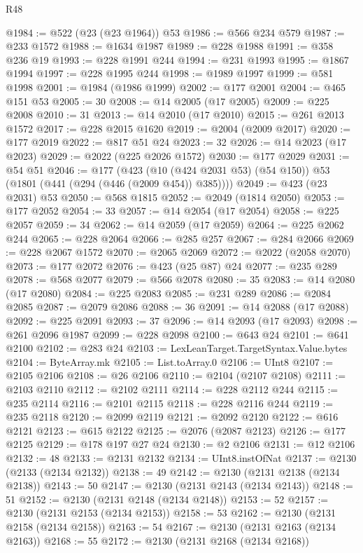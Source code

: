 \begin{lexlean}{R48}
\begin{coremodule}
@1984 := @522 (@23 (@23 @1964)) @53
@1986 := @566 @234 @579
@1987 := @233 @1572
@1988 := @1634 @1987
@1989 := @228 @1988
@1991 := @358 @236 @19
@1993 := @228 @1991 @244
@1994 := @231 @1993
@1995 := @1867 @1994
@1997 := @228 @1995 @244
@1998 := @1989 @1997
@1999 := @581 @1998
@2001 := @1984 (@1986 @1999)
@2002 := @177 @2001
@2004 := @465 @151 @53
@2005 := 30
@2008 := @14 @2005 (@17 @2005)
@2009 := @225 @2008
@2010 := 31
@2013 := @14 @2010 (@17 @2010)
@2015 := @261 @2013 @1572
@2017 := @228 @2015 @1620
@2019 := @2004 (@2009 @2017)
@2020 := @177 @2019
@2022 := @817 @51 @24
@2023 := 32
@2026 := @14 @2023 (@17 @2023)
@2029 := @2022 (@225 @2026 @1572)
@2030 := @177 @2029
@2031 := @54 @51
@2046 := @177
    (@423 (@10 (@424 @2031 @53) (@54 @150)) @53 (@1801 (@441 (@294 (@446 (@2009 @454)) @385))))
@2049 := @423 (@23 @2031) @53
@2050 := @568 @1815
@2052 := @2049 (@1814 @2050)
@2053 := @177 @2052
@2054 := 33
@2057 := @14 @2054 (@17 @2054)
@2058 := @225 @2057
@2059 := 34
@2062 := @14 @2059 (@17 @2059)
@2064 := @225 @2062 @244
@2065 := @228 @2064
@2066 := @285 @257
@2067 := @284 @2066
@2069 := @228 @2067 @1572
@2070 := @2065 @2069
@2072 := @2022 (@2058 @2070)
@2073 := @177 @2072
@2076 := @423 (@25 @87) @24
@2077 := @235 @289
@2078 := @568 @2077
@2079 := @566 @2078
@2080 := 35
@2083 := @14 @2080 (@17 @2080)
@2084 := @225 @2083
@2085 := @231 @289
@2086 := @2084 @2085
@2087 := @2079 @2086
@2088 := 36
@2091 := @14 @2088 (@17 @2088)
@2092 := @225 @2091
@2093 := 37
@2096 := @14 @2093 (@17 @2093)
@2098 := @261 @2096 @1987
@2099 := @228 @2098
@2100 := @643 @24
@2101 := @641 @2100
@2102 := @283 @24
@2103 := LexLeanTarget.TargetSyntax.Value.bytes
@2104 := ByteArray.mk
@2105 := List.toArray.{0}
@2106 := UInt8
@2107 := @2105 @2106
@2108 := @26 @2106
@2110 := @2104 (@2107 @2108)
@2111 := @2103 @2110
@2112 := @2102 @2111
@2114 := @228 @2112 @244
@2115 := @235 @2114
@2116 := @2101 @2115
@2118 := @228 @2116 @244
@2119 := @235 @2118
@2120 := @2099 @2119
@2121 := @2092 @2120
@2122 := @616 @2121
@2123 := @615 @2122
@2125 := @2076 (@2087 @2123)
@2126 := @177 @2125
@2129 := @178 @197 @27 @24
@2130 := @2 @2106
@2131 := @12 @2106
@2132 := 48
@2133 := @2131 @2132
@2134 := UInt8.instOfNat
@2137 := @2130 (@2133 (@2134 @2132))
@2138 := 49
@2142 := @2130 (@2131 @2138 (@2134 @2138))
@2143 := 50
@2147 := @2130 (@2131 @2143 (@2134 @2143))
@2148 := 51
@2152 := @2130 (@2131 @2148 (@2134 @2148))
@2153 := 52
@2157 := @2130 (@2131 @2153 (@2134 @2153))
@2158 := 53
@2162 := @2130 (@2131 @2158 (@2134 @2158))
@2163 := 54
@2167 := @2130 (@2131 @2163 (@2134 @2163))
@2168 := 55
@2172 := @2130 (@2131 @2168 (@2134 @2168))

\end{coremodule}
\end{lexlean}
